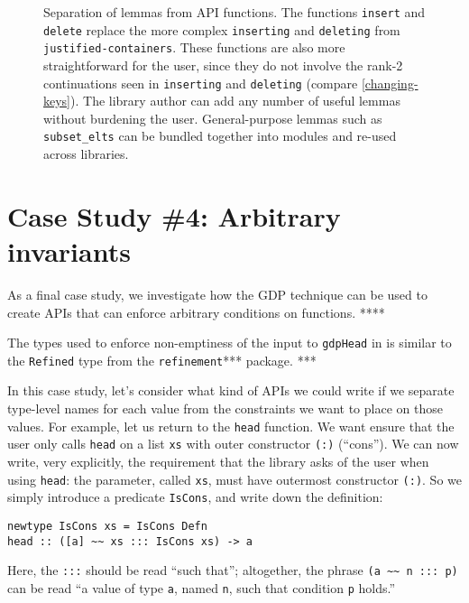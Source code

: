 \documentclass[format=sigplan, review=false, screen=true]{acmart}
\begin{document}
\begin{figure*}
  \begin{minipage}{0.49\textwidth}
    \inputminted{haskell}{delete1.hs}
  \end{minipage}
  \begin{minipage}{0.49\textwidth}
    \inputminted{haskell}{delete2.hs}
  \end{minipage}
  \caption{Separation of lemmas from API functions. The functions
    \texttt{insert} and \texttt{delete} replace the more complex
    \texttt{inserting} and \texttt{deleting} from \texttt{justified-containers}.
    These functions are also more straightforward for the user, since they do
    not involve the rank-2 continuations seen in \texttt{inserting} and \texttt{deleting} (compare \cref{changing-keys}).
    The library author can add any number of useful lemmas without burdening the
    user. General-purpose lemmas such as \texttt{subset\_elts} can be bundled
    together into modules and re-used across libraries.\label{lemma-demo}}
\end{figure*}

\section{Case Study \#4: Arbitrary invariants}

As a final case study, we investigate how the GDP technique can be used to
create APIs that can enforce arbitrary conditions on functions. ****

The types used to enforce non-emptiness of the input to \texttt{gdpHead} in
 is similar to the \texttt{Refined} type from the \texttt{refinement}***
package. ***

In this case study, let's consider what kind of APIs we could write if we separate
type-level names for each value from the constraints we want to place on those values.
For example, let us return to the \texttt{head} function. We want ensure that the
user only calls \texttt{head} on a list \texttt{xs} with outer constructor \texttt{(:)} (``cons''). We can now write, very explicitly, the requirement that the library asks of the user
when using \texttt{head}: the parameter, called \texttt{xs}, must have outermost constructor
\texttt{(:)}. So we simply introduce a predicate \texttt{IsCons}, and write down the definition:
\begin{verbatim}
newtype IsCons xs = IsCons Defn
head :: ([a] ~~ xs ::: IsCons xs) -> a
\end{verbatim}
Here, the \texttt{:::} should be read ``such that''; altogether, the phrase 
\verb|(a ~~ n ::: p)| can be read ``a value of type \texttt{a}, named \texttt{n}, such
that condition \texttt{p} holds.''
\end{document}
